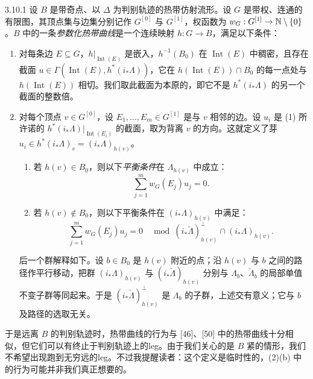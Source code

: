 \begin{definition}{3.10.1}
设 $B$ 是带奇点、以 $\Delta$ 为判别轨迹的热带仿射流形。设 $G$ 是带权、连通的有限图，其顶点集与边集分别记作 $G^{[0]}$ 与 $G^{[1]}$，权函数为 $w_G:G^{[1]}\to\mathbb{N}\setminus\{0\}$。$B$ 中的一条\emph{参数化热带曲线}是一个连续映射 $h:G\to B$，满足以下条件：
\begin{enumerate}[label=(\arabic*)]
\item 对每条边 $E\subseteq G$，$h|_{\operatorname{Int}(E)}$ 是嵌入，$h^{-1}(B_0)$ 在 $\operatorname{Int}(E)$ 中稠密，且存在截面 $u\in\Gamma(\operatorname{Int}(E),h^*(i_*\Lambda))$，它在 $h(\operatorname{Int}(E))\cap B_0$ 的每一点处与 $h(\operatorname{Int}(E))$ 相切。我们取此截面为本原的，即它不是 $h^*(i_*\Lambda)$ 的另一个截面的整数倍。
\item 对每个顶点 $v\in G^{[0]}$，设 $E_1,\dots,E_m\in G^{[1]}$ 是与 $v$ 相邻的边。设 $u_i$ 是 (1) 所许诺的 $h^*(i_*\Lambda)|_{\operatorname{Int}(E_i)}$ 的截面，取为背离 $v$ 的方向。这就定义了芽 $u_i\in h^*(i_*\Lambda)_v=(i_*\Lambda)_{h(v)}$。
\begin{enumerate}[label=(\alph*)]
\item 若 $h(v)\in B_0$，则以下\emph{平衡条件}在 $\Lambda_{h(v)}$ 中成立：
\[
\sum_{j=1}^mw_G(E_j)u_j=0.
\]
\item 若 $h(v)\notin B_0$，则以下平衡条件在 $(i_*\Lambda)_{h(v)}$ 中满足：
\[
\sum_{j=1}^mw_G(E_j)u_j=0\quad\operatorname{mod}\ (i_*\check\Lambda)^\perp_{h(v)}\cap(i_*\Lambda)_{h(v)}.
\]
\end{enumerate}
后一个群解释如下。设 $b\in B_0$ 是 $h(v)$ 附近的点；沿 $h(v)$ 与 $b$ 之间的路径作平行移动，把群 $(i_*\Lambda)_{h(v)}$ 与 $(i_*\check\Lambda)_{h(v)}$ 分别与 $\Lambda_b$、$\check\Lambda_b$ 的局部单值不变子群等同起来。于是 $(i_*\check\Lambda)^\perp_{h(v)}$ 是 $\Lambda_b$ 的子群，上述交有意义；它与 $b$ 及路径的选取无关。
\end{enumerate}
\end{definition}

于是远离 $B$ 的判别轨迹时，热带曲线的行为与 [46]、[50] 中的热带曲线十分相似，但它们可以有终止于判别轨迹上的leg。由于我们关心的是 $B$ 紧的情形，我们不希望出现跑到无穷远的leg。不过我提醒读者：这个定义是临时性的，(2)(b) 中的行为可能并非我们真正想要的。

